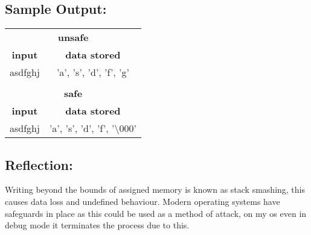\documentclass[Lab-B.tex]{subfiles}
\begin{document}
        \subsection*{Sample Output:}
            \begin{center}
                \begin{tabular}{c c}
                    \hline
                    \multicolumn{2}{c}{\textbf{unsafe}} \\
                    \textbf{input} & \textbf{data stored} \\
                    \hline
                    asdfghj & 'a', 's', 'd', 'f', 'g' \\
                    \\
                    \hline
                    \multicolumn{2}{c}{\textbf{safe}} \\
                    \textbf{input} & \textbf{data stored} \\
                    \hline
                    asdfghj & 'a', 's', 'd', 'f', '\textbackslash000' \\
                    
                \end{tabular}
            \end{center}

        \subsection*{Reflection:}
            Writing beyond the bounds of assigned memory is known as stack smashing,
            this causes data loss and undefined behaviour. Modern operating systems
            have safeguards in place as this could be used as a method of attack,
            on my os even in debug mode it terminates the process due to this.    
\end{document}
